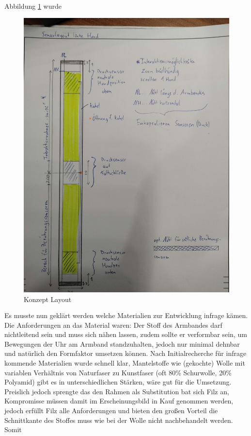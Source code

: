 \documentclass[12pt, a4paper]{article}
\begin{document}
\newpage

Abbildung \ref{fig:concept_layout} wurde

\begin{figure}[h]
	\centering
	\includegraphics[scale=.1]{assets/Design_drawing.jpg}
	\caption{Konzept Layout}
	\label{fig:concept_layout}
\end{figure}

\newpage

Es musste nun geklärt werden welche Materialien zur Entwicklung infrage kämen. Die Anforderungen an das Material waren: Der Stoff des Armbandes darf nichtleitend sein und muss sich nähen lassen, zudem sollte er verformbar sein, um Bewegungen der Uhr am Armband standzuhalten, jedoch nur minimal dehnbar und natürlich den Formfaktor umsetzen können. Nach Initialrecherche für infrage kommende Materialien wurde schnell klar, Mantelstoffe wie (gekochte) Wolle mit variablen Verhältnis von Naturfaser zu Kunstfaser (oft 80\% Schurwolle, 20\% Polyamid) gibt es in unterschiedlichen Stärken, wäre gut für die Umsetzung. Preislich jedoch sprengte das den Rahmen als Substitution bat sich Filz an, Kompromisse müssen damit im Erscheinungsbild in Kauf genommen werden, jedoch erfüllt Filz alle Anforderungen und bieten den großen Vorteil die Schnittkante des Stoffes muss wie bei der Wolle nicht nachbehandelt werden. Somit 
\end{document}
